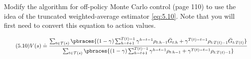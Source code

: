 
\begin{exercise}[Exercise 5.14]

Modify the algorithm for off-policy Monte Carlo control (page 110) to use the idea of the truncated weighted-average estimator \eqref{eq:5.10}.
Note that you will first need to convert this equation to action values.

\end{exercise}


\begin{solution}

\begin{align} \label{eq:5.10} \tag{5.10}
    V(s)
    \doteq
    \frac
    {
        \sum_{t \in \mathcal T(s)}
        \pbraces{
            (1 - \gamma)
            \sum_{h = t + 1}^{T(t) - 1}
                \gamma^{h-t-1}
                \rho_{t : h - 1}
                \bar G_{t:h}
            +
            \gamma^{T(t) - t - 1}
            \rho_{t : T(t) - 1}
            \bar G_{t : T(t)}
        }
    }{
        \sum_{t \in \mathcal T(s)}
        \pbraces{
            (1 - \gamma)
            \sum_{h = t + 1}^{T(t) - 1}
                \gamma^{h-t-1}
                \rho_{t : h - 1}
            +
            \gamma^{T(t) - t - 1}
            \rho_{t : T(t) - 1}
        }
    }
\end{align}

\end{solution}

